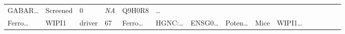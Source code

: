 \documentclass[
]{article}
\begin{document}
\begin{longtable}[]{@{}lllllllllllllll@{}}
\begin{minipage}[t]{0.05\columnwidth}
GABAR\ldots{}\strut
\end{minipage} & \begin{minipage}[t]{0.05\columnwidth}\raggedright
Screened\strut
\end{minipage} & \begin{minipage}[t]{0.05\columnwidth}\raggedright
0\strut
\end{minipage} & \begin{minipage}[t]{0.05\columnwidth}\raggedright
\emph{NA}\strut
\end{minipage} & \begin{minipage}[t]{0.05\columnwidth}\raggedright
Q9H0R8\strut
\end{minipage} & \begin{minipage}[t]{0.02\columnwidth}\raggedright
\ldots{}\strut
\end{minipage}\tabularnewline
\begin{minipage}[t]{0.05\columnwidth}\raggedright
Ferro\ldots{}\strut
\end{minipage} & \begin{minipage}[t]{0.05\columnwidth}\raggedright
WIPI1\strut
\end{minipage} & \begin{minipage}[t]{0.04\columnwidth}\raggedright
driver\strut
\end{minipage} & \begin{minipage}[t]{0.02\columnwidth}\raggedright
67\strut
\end{minipage} & \begin{minipage}[t]{0.05\columnwidth}\raggedright
Ferro\ldots{}\strut
\end{minipage} & \begin{minipage}[t]{0.05\columnwidth}\raggedright
HGNC:\ldots{}\strut
\end{minipage} & \begin{minipage}[t]{0.05\columnwidth}\raggedright
ENSG0\ldots{}\strut
\end{minipage} & \begin{minipage}[t]{0.05\columnwidth}\raggedright
Poten\ldots{}\strut
\end{minipage} & \begin{minipage}[t]{0.05\columnwidth}\raggedright
Mice\strut
\end{minipage} & \begin{minipage}[t]{0.05\columnwidth}\raggedright
WIPI1\ldots{}\strut
\end{minipage} & \begin{minipage}[t]{0.05\columnwidth}\raggedright

\end{minipage}
\end{longtable}
\end{document}
